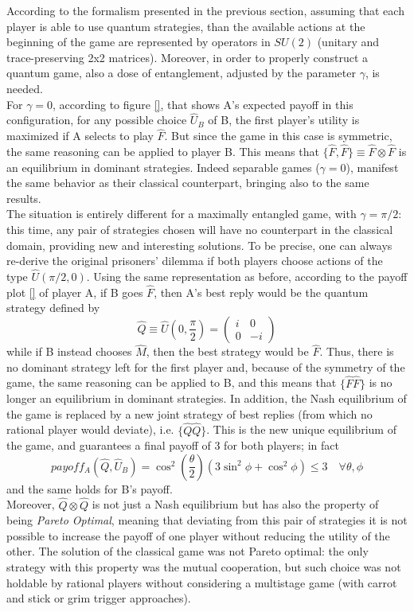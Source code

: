 According to the formalism presented in the previous section, assuming that each player is able to use quantum strategies, than the available actions at the beginning of the game are represented by operators in $SU(2)$ (unitary and trace-preserving 2x2 matrices). Moreover, in order to properly construct a quantum game, also a dose of entanglement, adjusted by the parameter $\gamma$, is needed.\\
For $\gamma=0$, according to figure \ref{}, that shows A's expected payoff in this configuration, for any possible choice $\hat{U}_B$ of B, the first player's utility is maximized if A selects to play $\hat{F}$. But since the game in this case is symmetric, the same reasoning can be applied to player B. This means that $\{\hat{F},\hat{F}\}\equiv\hat{F}\otimes\hat{F}$ is an equilibrium in dominant strategies. Indeed separable games ($\gamma=0$), manifest the same behavior as their classical counterpart, bringing also to the same results.\\
The situation is entirely different for a maximally entangled game, with $\gamma=\pi/2$: this time, any pair of strategies chosen will have no counterpart in the classical domain, providing new and interesting solutions. To be precise, one can always re-derive the original prisoners' dilemma if both players choose actions of the type $\hat{U}(\pi/2,0)$. Using the same representation as before, according to the payoff plot \ref{} of player A, if B goes $\hat{F}$, then A's best reply would be the quantum strategy defined by
\[ \hat{Q} \equiv \hat{U}(0,\frac{\pi}{2}) = \begin{pmatrix} i&0\\0&-i \end{pmatrix} \]
while if B instead chooses $\hat{M}$, then the best strategy would be $\hat{F}$. Thus, there is no dominant strategy left for the first player and, because of the symmetry of the game, the same reasoning can be applied to B, and this means that $\{\hat{F}\hat{F}\}$ is no longer an equilibrium in dominant strategies. In addition, the Nash equilibrium of the game is replaced by a new joint strategy of best replies (from which no rational player would deviate), i.e. $\{\hat{Q}\hat{Q}\}$. This is the new unique equilibrium of the game, and guarantees a final payoff of 3 for both players; in fact
\[ payoff_A(\hat{Q},\hat{U}_B)=\cos^2\left(\frac{\theta}{2}\right)\left(3\sin^2\phi + \cos^2\phi \right)\leq 3 \quad \forall\theta,\phi \]
and the same holds for B's payoff.\\
Moreover, $\hat{Q}\otimes\hat{Q}$ is not just a Nash equilibrium but has also the property of being \textit{Pareto Optimal}, meaning that deviating from this pair of strategies it is not possible to increase the payoff of one player
without reducing the utility of the other. The solution of the classical game was not Pareto optimal: the only strategy with this property was the mutual cooperation, but such choice was not holdable by rational players without considering a multistage game (with carrot and stick or grim trigger approaches).\\

